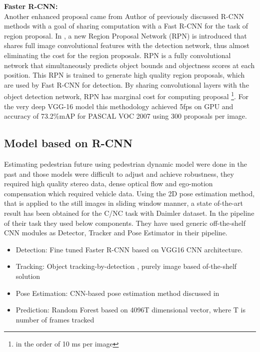 \newpara \textbf{Faster R-CNN:} \\  
Another enhanced proposal came from Author of previously discussed R-CNN methods with a goal of sharing computation with a Fast R-CNN for the task of region proposal. In \cite{ren2015faster}, a new Region Proposal Network (RPN) is introduced that shares full image convolutional features with the detection network, thus almost eliminating the cost for the region proposals. RPN is a fully convolutional network that simultaneously predicts object bounds and objectness scores at each position. This RPN is trained to generate high quality region proposals, which are used by Fast R-CNN for detection. By sharing convolutional layers with the object detection network, RPN has marginal cost for computing proposal \footnote{in the order of 10 ms per image}. For the very deep VGG-16 model this methodology achieved 5fps on GPU and accuracy of 73.2\%mAP for PASCAL VOC 2007 using 300 proposals per image. 

\subsection{Model based on R-CNN}
\newpara Estimating pedestrian future using pedestrian dynamic model were done in the past and those models were difficult to adjust and achieve robustness, they required high quality stereo data, dense optical flow and ego-motion compensation which required vehicle data.  Using the 2D pose estimation method, that is applied to the still images in sliding window manner, a state of-the-art result has been obtained\cite{fang2018pedestrian} for the C/NC task with Daimler dataset. In the pipeline of their task they used below components. They have used generic off-the-shelf CNN modules as Detector, Tracker and Pose Estimator in their pipeline.

\begin{itemize}
	\item Detection: Fine tuned Faster R-CNN \cite{ren2015faster} based on VGG16 CNN architecture. 
	\item Tracking: Object tracking-by-detection \cite{wojke2017simple}, purely image based of-the-shelf solution 
	\item Pose Estimation: CNN-based pose estimation method discussed in \cite{cao2017realtime}
	\item Prediction: Random Forest based on 4096T dimensional vector, where T is number of frames tracked
\end{itemize}

